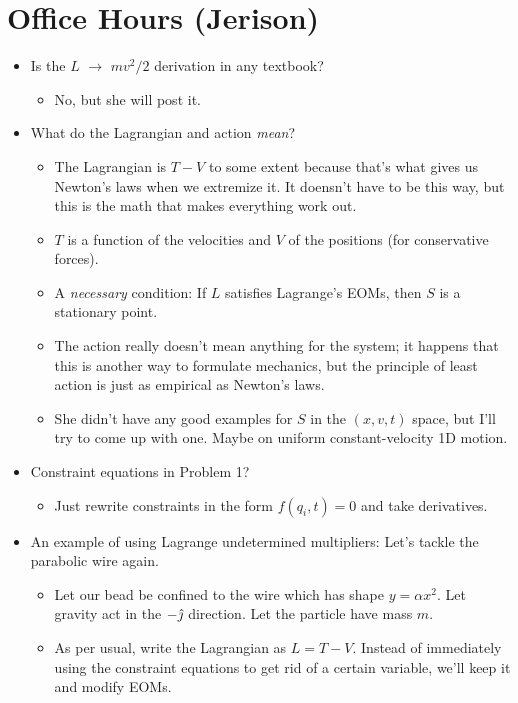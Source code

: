 \documentclass[../notes.tex]{subfiles}
\begin{document}
\section{Office Hours (Jerison)}
\begin{itemize}
    \item Is the $L$ $\to$ $mv^2/2$ derivation in any textbook?
    \begin{itemize}
        \item No, but she will post it.
    \end{itemize}
    \item What do the Lagrangian and action \emph{mean}?
    \begin{itemize}
        \item The Lagrangian is $T-V$ to some extent because that's what gives us Newton's laws when we extremize it. It doensn't have to be this way, but this is the math that makes everything work out.
        \item $T$ is a function of the velocities and $V$ of the positions (for conservative forces).
        \item A \emph{necessary} condition: If $L$ satisfies Lagrange's EOMs, then $S$ is a stationary point.
        \item The action really doesn't mean anything for the system; it happens that this is another way to formulate mechanics, but the principle of least action is just as empirical as Newton's laws.
        \item She didn't have any good examples for $S$ in the $(x,v,t)$ space, but I'll try to come up with one. Maybe on uniform constant-velocity 1D motion.
    \end{itemize}
    \item Constraint equations in Problem 1?
    \begin{itemize}
        \item Just rewrite constraints in the form $f(q_i,t)=0$ and take derivatives.
    \end{itemize}
    \item An example of using Lagrange undetermined multipliers: Let's tackle the parabolic wire again.
    \begin{itemize}
        \item Let our bead be confined to the wire which has shape $y=\alpha x^2$. Let gravity act in the $-\hat{\jmath}$ direction. Let the particle have mass $m$.
        \item As per usual, write the Lagrangian as $L=T-V$. Instead of immediately using the constraint equations to get rid of a certain variable, we'll keep it and modify EOMs.

\end{itemize}
\end{itemize}
\end{document}
